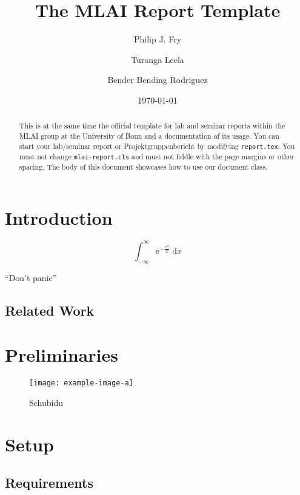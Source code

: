 \documentclass[logo]{mlai-report}
\title{The MLAI Report Template}
\author{Philip J. Fry \and Turanga Leela \and Bender Bending Rodriguez}
\date{\today}
\begin{document}
	\maketitle
	
	\begin{abstract}
		This is at the same time the official template for lab and seminar reports within the MLAI group at the University of Bonn and a documentation of its usage.
		You can start your lab/seminar report or Projektgruppenbericht by modifying \texttt{report.tex}.
		You must not change \texttt{mlai-report.cls} and must not fiddle with the page margins or other spacing.
		The body of this document showcases how to use our document class.
	\end{abstract}

	\section[Introduction]{Introduction\protect{}}
	
	\begin{equation}
	\int_{-\infty}^\infty \mathrm{e}^{-\frac{x^2}{2}} \; \mathrm{d}x 
	\end{equation}
	
	\enquote{Don't panic} \parencite{adams1979} \blindtext
	
	\subsection[Related Work]{Related Work\protect{}}
	
	\section{Preliminaries} 

	\begin{figure}[tp] 
		\centering
		\texttt{[image: example-image-a]} 
		\caption{Schubidu} 
		\label{fig:example-image} 
	\end{figure}

	\section{Setup} 
	
	\subsection{Requirements} 
	
\end{document}
